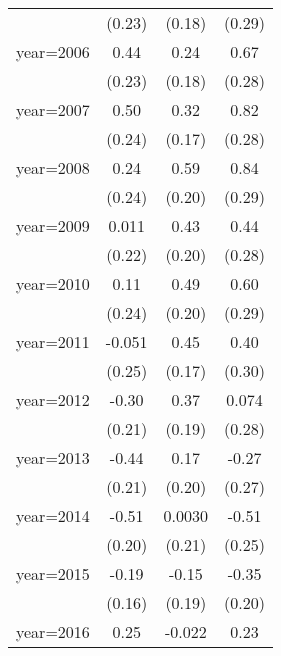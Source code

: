 \begin{sidewaystable}[htbp]
\begin{tabular}{l*{3}{c}}
                &   (0.23)         &   (0.18)         &   (0.29)         \\
\addlinespace
year=2006       &     0.44\sym{*}  &     0.24         &     0.67\sym{**} \\
                &   (0.23)         &   (0.18)         &   (0.28)         \\
\addlinespace
year=2007       &     0.50\sym{**} &     0.32\sym{*}  &     0.82\sym{***}\\
                &   (0.24)         &   (0.17)         &   (0.28)         \\
\addlinespace
year=2008       &     0.24         &     0.59\sym{***}&     0.84\sym{***}\\
                &   (0.24)         &   (0.20)         &   (0.29)         \\
\addlinespace
year=2009       &    0.011         &     0.43\sym{**} &     0.44         \\
                &   (0.22)         &   (0.20)         &   (0.28)         \\
\addlinespace
year=2010       &     0.11         &     0.49\sym{**} &     0.60\sym{**} \\
                &   (0.24)         &   (0.20)         &   (0.29)         \\
\addlinespace
year=2011       &   -0.051         &     0.45\sym{**} &     0.40         \\
                &   (0.25)         &   (0.17)         &   (0.30)         \\
\addlinespace
year=2012       &    -0.30         &     0.37\sym{*}  &    0.074         \\
                &   (0.21)         &   (0.19)         &   (0.28)         \\
\addlinespace
year=2013       &    -0.44\sym{**} &     0.17         &    -0.27         \\
                &   (0.21)         &   (0.20)         &   (0.27)         \\
\addlinespace
year=2014       &    -0.51\sym{**} &   0.0030         &    -0.51\sym{**} \\
                &   (0.20)         &   (0.21)         &   (0.25)         \\
\addlinespace
year=2015       &    -0.19         &    -0.15         &    -0.35\sym{*}  \\
                &   (0.16)         &   (0.19)         &   (0.20)         \\
\addlinespace
year=2016       &     0.25\sym{***}&   -0.022         &     0.23\sym{*}  \\

\end{tabular}
\end{sidewaystable}
